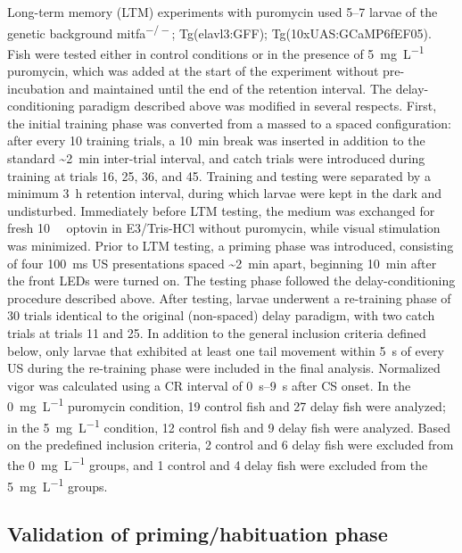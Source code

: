Long-term memory (LTM) experiments with puromycin used \SIrange{5}{7}{\dpf} larvae of the genetic background mitfa\textsuperscript{\(-/-\)}; Tg(elavl3:GFF); Tg(10xUAS:GCaMP6fEF05). Fish were tested either in control conditions or in the presence of \SI{5}{\milli\gram\per\liter} puromycin, which was added at the start of the experiment without pre-incubation and maintained until the end of the retention interval. The delay-conditioning paradigm described above was modified in several respects. First, the initial training phase was converted from a massed to a spaced configuration: after every 10 training trials, a \SI{10}{\minute} break was inserted in addition to the standard \textasciitilde\SI{2}{\minute} inter-trial interval, and catch trials were introduced during training at trials 16, 25, 36, and 45. Training and testing were separated by a minimum \SI{3}{\hour} retention interval, during which larvae were kept in the dark and undisturbed. Immediately before LTM testing, the medium was exchanged for fresh \SI{10}{\micro\Molar} optovin in E3/Tris-HCl without puromycin, while visual stimulation was minimized. Prior to LTM testing, a priming phase was introduced, consisting of four \SI{100}{\milli\second} US presentations spaced \textasciitilde\SI{2}{\minute} apart, beginning \SI{10}{\minute} after the front LEDs were turned on. The testing phase followed the delay-conditioning procedure described above. After testing, larvae underwent a re-training phase of 30 trials identical to the original (non-spaced) delay paradigm, with two catch trials at trials 11 and 25. In addition to the general inclusion criteria defined below, only larvae that exhibited at least one tail movement within \SI{5}{\second} of every US during the re-training phase were included in the final analysis. Normalized vigor was calculated using a CR interval of \SIrange{0}{9}{\second} after CS onset. In the 0~\si{\milli\gram\per\liter} puromycin condition, 19 control fish and 27 delay fish were analyzed; in the \SI{5}{\milli\gram\per\liter} condition, 12 control fish and 9 delay fish were analyzed. Based on the predefined inclusion criteria, 2 control and 6 delay fish were excluded from the 0~\si{\milli\gram\per\liter} groups, and 1 control and 4 delay fish were excluded from the \SI{5}{\milli\gram\per\liter} groups.

\subsection{Validation of priming/habituation phase}

